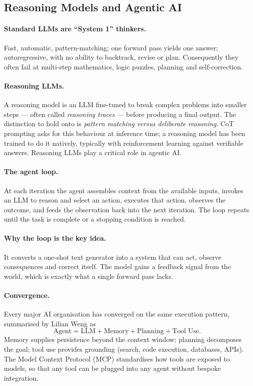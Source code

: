 \documentclass[11pt,a4paper]{article}
\begin{document}
\subsection{Reasoning Models and Agentic AI}

\paragraph{Standard LLMs are ``System 1'' thinkers.} Fast, automatic, pattern-matching; one
forward pass yields one answer; autoregressive, with no ability to backtrack, revise or plan.
Consequently they often fail at multi-step mathematics, logic puzzles, planning and
self-correction.

\paragraph{Reasoning LLMs.} A reasoning model is an LLM fine-tuned to break complex problems
into smaller steps --- often called \emph{reasoning traces} --- before producing a final
output. The distinction to hold onto is \emph{pattern matching versus deliberate reasoning}.
CoT prompting asks for this behaviour at inference time; a reasoning model has been trained to
do it natively, typically with reinforcement learning against verifiable answers. Reasoning
LLMs play a critical role in agentic AI.

\paragraph{The agent loop.} At each iteration the agent assembles context from the available
inputs, invokes an LLM to reason and select an action, executes that action, observes the
outcome, and feeds the observation back into the next iteration. The loop repeats until the
task is complete or a stopping condition is reached.

\paragraph{Why the loop is the key idea.} It converts a one-shot text generator into a system
that can act, observe consequences and correct itself. The model gains a feedback signal from
the world, which is exactly what a single forward pass lacks.

\paragraph{Convergence.} Every major AI organisation has converged on the same execution
pattern, summarised by Lilian Weng as
\[
\text{Agent} = \text{LLM} + \text{Memory} + \text{Planning} + \text{Tool Use}.
\]
Memory supplies persistence beyond the context window; planning decomposes the goal; tool use
provides grounding (search, code execution, databases, APIs). The Model Context Protocol (MCP)
standardises how tools are exposed to models, so that any tool can be plugged into any agent
without bespoke integration.
\end{document}
